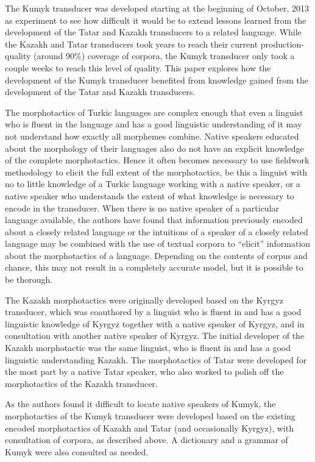 \documentclass[a4paper,11pt,twocolumn]{article}
\begin{document}
The Kumyk transducer was developed starting at the beginning of October, 2013 as experiment to see how difficult it would be to extend lessons learned from the development of the Tatar and Kazakh transducers to a related language.  While the Kazakh and Tatar transducers took years to reach their current production-quality (around 90\%) coverage of corpora, the Kumyk transducer only took a couple weeks to reach this level of quality.  This paper explores how the development of the Kumyk transducer benefited from knowledge gained from the development of the Tatar and Kazakh transducers.

The morphotactics of Turkic languages are complex enough that even a linguist who is fluent in the language and has a good linguistic understanding of it may not understand how exactly all morphemes combine.  Native speakers educated about the morphology of their languages also do not have an explicit knowledge of the complete morphotactics.  Hence it often becomes necessary to use fieldwork methodology to elicit the full extent of the morphotactics, be this a linguist with no to little knowledge of a Turkic language working with a native speaker, or a native speaker who understands the extent of what knowledge is necessary to encode in the transducer.  When there is no native speaker of a particular language available, the authors have found that information previously encoded about a closely related language or the intuitions of a speaker of a closely related language may be combined with the use of textual corpora to ``elicit'' information about the morphotactics of a language.  Depending on the contents of corpus and chance, this may not result in a completely accurate model, but it is possible to be thorough.

The Kazakh morphotactics were originally developed based on the Kyrgyz transducer, which was coauthored by a linguist who is fluent in and has a good linguistic knowledge of Kyrgyz together with a native speaker of Kyrgyz, and in consultation with another native speaker of Kyrgyz.  The initial developer of the Kazakh morphotactic was the same linguist, who is fluent in and has a good linguistic understanding Kazakh.  The morphotactics of Tatar were developed for the most part by a native Tatar speaker, who also worked to polish off the morphotactics of the Kazakh transducer.

As the authors found it difficult to locate native speakers of Kumyk, the morphotactics of the Kumyk transducer were developed based on the existing encoded morphotactics of Kazakh and Tatar (and occasionally Kyrgyz), with consultation of corpora, as described above.  A dictionary \citep{bammatov1960} and a grammar \citep{olmesov2000} of Kumyk were also consulted as needed.
\end{document}
